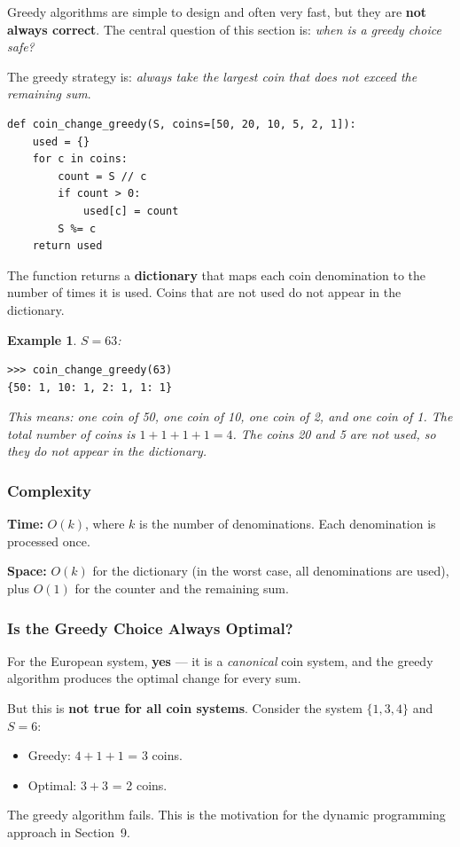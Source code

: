 \documentclass[11pt,a4paper]{article}
\newtheorem{example}[theorem]{Example}
\begin{document}
Greedy algorithms are simple to design and often very fast, but they are \textbf{not always correct}. The central question of this section is: \emph{when is a greedy choice safe?}


The greedy strategy is: \emph{always take the largest coin that does not exceed the remaining sum}.

\begin{lstlisting}
def coin_change_greedy(S, coins=[50, 20, 10, 5, 2, 1]):
    used = {}
    for c in coins:
        count = S // c
        if count > 0:
            used[c] = count
        S %= c
    return used
\end{lstlisting}

The function returns a \textbf{dictionary} that maps each coin denomination to the number of times it is used. Coins that are not used do not appear in the dictionary.

\begin{example}
\( S = 63 \):
\begin{lstlisting}
>>> coin_change_greedy(63)
{50: 1, 10: 1, 2: 1, 1: 1}
\end{lstlisting}
This means: one coin of 50, one coin of 10, one coin of 2, and one coin of 1. The total number of coins is \( 1 + 1 + 1 + 1 = 4 \). The coins 20 and 5 are not used, so they do not appear in the dictionary.
\end{example}

\subsubsection{Complexity}

\textbf{Time:} \( O(k) \), where \( k \) is the number of denominations. Each denomination is processed once.

\textbf{Space:} \( O(k) \) for the dictionary (in the worst case, all denominations are used), plus \( O(1) \) for the counter and the remaining sum.

\subsubsection{Is the Greedy Choice Always Optimal?}

For the European system, \textbf{yes} --- it is a \emph{canonical} coin system, and the greedy algorithm produces the optimal change for every sum.

But this is \textbf{not true for all coin systems}. Consider the system \( \{1, 3, 4\} \) and \( S = 6 \):
\begin{itemize}
    \item Greedy: \( 4 + 1 + 1 \) = 3 coins.
    \item Optimal: \( 3 + 3 \) = 2 coins.
\end{itemize}
The greedy algorithm fails. This is the motivation for the dynamic programming approach in Section~9.
\end{document}
